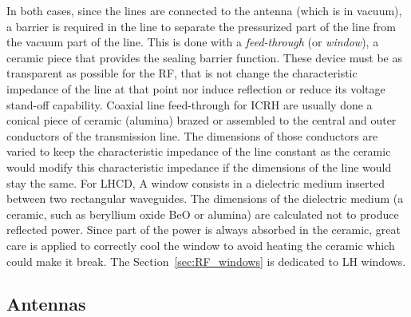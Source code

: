 In both cases, since the lines are connected to the antenna (which is in vacuum), a barrier is required in the
line to separate the pressurized part of the line from the vacuum part of the line. This is done with a \textit{feed-through} (or \textit{window}), a ceramic piece that provides the sealing barrier function. These device must be as transparent as possible for the RF, that is not change the characteristic impedance of the line at that point nor induce reflection or reduce its voltage stand-off capability. Coaxial line feed-through for ICRH are usually done a conical piece of ceramic (alumina) brazed or assembled to the central and outer conductors of the transmission line. The dimensions of those conductors are varied to keep the characteristic impedance of the line constant as the ceramic would modify this characteristic impedance if the dimensions of the line would stay the same. For LHCD, A window consists in a dielectric medium inserted between two rectangular waveguides. The dimensions of the dielectric medium (a ceramic, such as beryllium oxide BeO or alumina) are calculated not to produce reflected power. Since part of the power is always absorbed in the ceramic, great care is applied to correctly cool the window to avoid heating the ceramic which could make it break. The Section~\ref{sec:RF_windows} is dedicated to LH windows.


\subsection{Antennas}\label{sec:RF_antennas}

